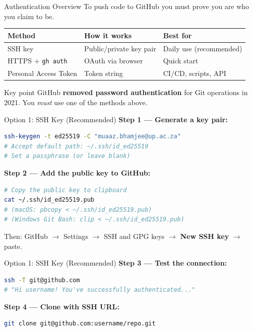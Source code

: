 \documentclass[aspectratio=169, 11pt]{beamer}
\begin{document}
\begin{frame}{Authentication Overview}
  To push code to GitHub you must prove you are who you claim to be.

  \vspace{0.5em}
  \begin{table}
    \centering
    \begin{tabular}{@{} l l l @{}}
      \toprule
      \textbf{Method} & \textbf{How it works} & \textbf{Best for} \\
      \midrule
      SSH key       & Public/private key pair & Daily use (recommended) \\
      HTTPS + \texttt{gh auth} & OAuth via browser & Quick start \\
      Personal Access Token & Token string      & CI/CD, scripts, API \\
      \bottomrule
    \end{tabular}
  \end{table}

  \vspace{0.5em}
  \begin{block}{Key point}
    GitHub \textbf{removed password authentication} for Git operations in 2021.
    You \emph{must} use one of the methods above.
  \end{block}
\end{frame}

\begin{frame}[fragile]{Option 1: SSH Key (Recommended)}
  \textbf{Step 1 --- Generate a key pair:}
  \begin{lstlisting}[language=bash]
ssh-keygen -t ed25519 -C "muaaz.bhamjee@up.ac.za"
# Accept default path: ~/.ssh/id_ed25519
# Set a passphrase (or leave blank)
  \end{lstlisting}

  \textbf{Step 2 --- Add the public key to GitHub:}
  \begin{lstlisting}[language=bash]
# Copy the public key to clipboard
cat ~/.ssh/id_ed25519.pub
# (macOS: pbcopy < ~/.ssh/id_ed25519.pub)
# (Windows Git Bash: clip < ~/.ssh/id_ed25519.pub)
  \end{lstlisting}
  Then: GitHub $\to$ Settings $\to$ SSH and GPG keys $\to$ \textbf{New SSH key} $\to$ paste.
\end{frame}

\begin{frame}[fragile]{Option 1: SSH Key (Recommended)}
  \vspace{0.3em}
  \textbf{Step 3 --- Test the connection:}
  \begin{lstlisting}[language=bash]
ssh -T git@github.com
# "Hi username! You've successfully authenticated..."
  \end{lstlisting}

  \textbf{Step 4 --- Clone with SSH URL:}
  \begin{lstlisting}[language=bash]
git clone git@github.com:username/repo.git
  \end{lstlisting}
\end{frame}
\end{document}

